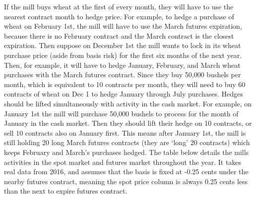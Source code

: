 \documentclass[
]{book}
\begin{document}
If the mill buys wheat at the first of every month, they will have to use the nearest contract month to hedge price. For example, to hedge a purchase of wheat on February 1st, the mill will have to use the March futures expiration, because there is no February contract and the March contract is the closest expiration. Then suppose on December 1st the mill wants to lock in its wheat purchase price (aside from basis risk) for the first six months of the next year. Then, for example, it will have to hedge January, February, and March wheat purchases with the March futures contract. Since they buy 50,000 bushels per month, which is equivalent to 10 contracts per month, they will need to buy 60 contracts of wheat on Dec 1 to hedge January through July purchases. Hedges should be lifted simultaneously with activity in the cash market. For example, on January 1st the mill will purchase 50,000 bushels to process for the month of January in the cash market. Then they should lift their hedge on 10 contracts, or sell 10 contracts also on January first. This means after January 1st, the mill is still holding 20 long March futures contracts (they are `long' 20 contracts) which keeps February and March's purchases hedged. The table below details the mills activities in the spot market and futures market throughout the year. It takes real data from 2016, and assumes that the basis is fixed at -0.25 cents under the nearby futures contract, meaning the spot price column is always 0.25 cents less than the next to expire futures contract.
\end{document}
